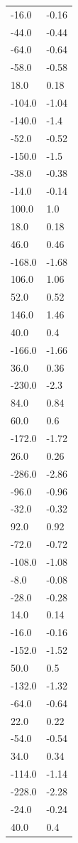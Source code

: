\begin{longtable}{ll}
-16.0 & -0.16 \\
-44.0 & -0.44 \\
-64.0 & -0.64 \\
-58.0 & -0.58 \\
18.0 & 0.18 \\
-104.0 & -1.04 \\
-140.0 & -1.4 \\
-52.0 & -0.52 \\
-150.0 & -1.5 \\
-38.0 & -0.38 \\
-14.0 & -0.14 \\
100.0 & 1.0 \\
18.0 & 0.18 \\
46.0 & 0.46 \\
-168.0 & -1.68 \\
106.0 & 1.06 \\
52.0 & 0.52 \\
146.0 & 1.46 \\
40.0 & 0.4 \\
-166.0 & -1.66 \\
36.0 & 0.36 \\
-230.0 & -2.3 \\
84.0 & 0.84 \\
60.0 & 0.6 \\
-172.0 & -1.72 \\
26.0 & 0.26 \\
-286.0 & -2.86 \\
-96.0 & -0.96 \\
-32.0 & -0.32 \\
92.0 & 0.92 \\
-72.0 & -0.72 \\
-108.0 & -1.08 \\
-8.0 & -0.08 \\
-28.0 & -0.28 \\
14.0 & 0.14 \\
-16.0 & -0.16 \\
-152.0 & -1.52 \\
50.0 & 0.5 \\
-132.0 & -1.32 \\
-64.0 & -0.64 \\
22.0 & 0.22 \\
-54.0 & -0.54 \\
34.0 & 0.34 \\
-114.0 & -1.14 \\
-228.0 & -2.28 \\
-24.0 & -0.24 \\
40.0 & 0.4 \\

\end{longtable}
